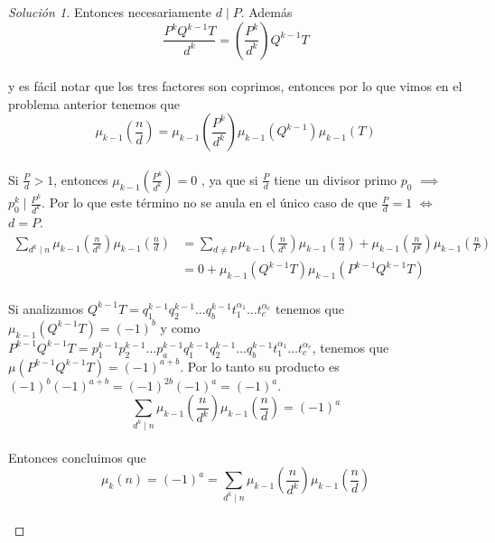 \documentclass{article}
\theoremstyle{definition}
\theoremstyle{remark}
\begin{document}
\begin{proof}[Soluci\'on 1]
Entonces necesariamente $d \mid P$. Adem\'as
$$\frac{P^kQ^{k - 1}T}{d^k} = \left ( \frac{P^k}{d^k} \right ) Q^{k - 1}T$$ \\
y es f\'acil notar que los tres factores son coprimos, entonces por lo que vimos en el problema anterior tenemos que 
$$\mu_{k - 1}(\frac{n}{d}) = \mu_{k - 1}\left ( \frac{P^k}{d^k} \right ) \mu_{k - 1}(Q^{k - 1}) \mu_{k - 1}(T)$$ \\
Si $\frac{P}{d} > 1$, entonces $\mu_{k - 1}( \frac{P^k}{d^k} ) = 0$ , ya que si $\frac{P}{d}$ tiene un divisor primo $p_0$ $\implies$ $p_0^{k} \mid \frac{P^k}{d^k}$. Por lo que este t\'ermino no se anula en el \'unico caso de que $\frac{P}{d} = 1$ $\iff$ $d = P$.
\begin{align*}
    \sum_{d^k \mid n}\mu_{k - 1}\left (\frac{n}{d^k}\right )\mu_{k - 1}\left (\frac{n}{d} \right ) &= \sum_{d \neq P}\mu_{k - 1}\left (\frac{n}{d^k}\right )\mu_{k - 1}\left( \frac{n}{d}\right ) + \mu_{k - 1}\left ( \frac{n}{P^k} \right ) \mu_{k - 1} \left ( \frac{n}{P} \right ) \\
    &= 0 + \mu_{k - 1}(Q^{k - 1}T) \mu_{k - 1}(P^{k - 1}Q^{k - 1}T)
\end{align*} \\
Si analizamos $Q^{k - 1}T = q_1^{k - 1}q_2^{k - 1}\dots q_b^{k - 1}t_1^{\alpha_1}\dots t_c^{\alpha_c}$ tenemos que $\mu_{k - 1}(Q^{k - 1}T) = (-1)^b$ y como $P^{k-1}Q^{k - 1}T = p_1^{k - 1}p_2^{k - 1}\dots p_a^{k - 1}q_1^{k - 1}q_2^{k - 1}\dots q_b^{k -1}t_1^{\alpha_1}\dots t_c^{\alpha_c}$, tenemos que $\mu(P^{k - 1}Q^{k - 1}T) = (-1)^{a + b}$. Por lo tanto su producto es $(-1)^b (-1)^{a + b} = (-1)^{2b} (-1)^a = (-1)^a.$
$$\sum_{d^k \mid n}\mu_{k - 1}\left (\frac{n}{d^k}\right )\mu_{k - 1}\left (\frac{n}{d} \right ) = (-1)^{a}$$ \\
Entonces concluimos que  
$$\mu_{k}(n) = (-1)^a = \sum_{d^k \mid n}\mu_{k - 1}\left (\frac{n}{d^k}\right )\mu_{k - 1}\left (\frac{n}{d} \right )$$ \\ 

\end{proof}
\end{document}
